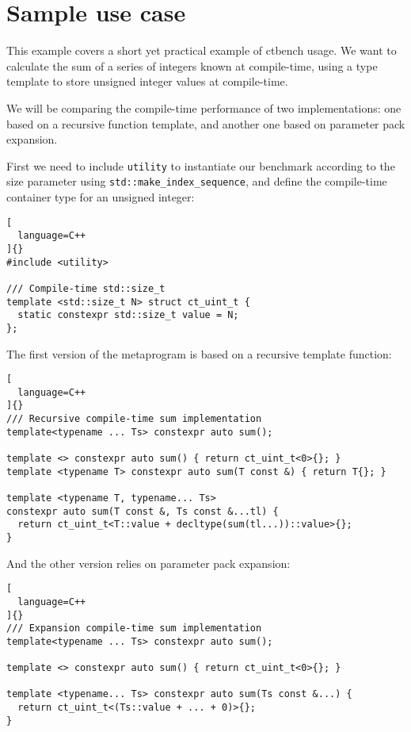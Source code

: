\documentclass[../main]{subfiles}
\begin{document}
\section{
  Sample use case
}

This example covers a short yet practical example of ctbench usage. We want to
calculate the sum of a series of integers known at compile-time, using a type
template to store unsigned integer values at compile-time.

We will be comparing the compile-time performance of two implementations:
one based on a recursive function template,
and another one based on  parameter pack expansion.

First we need to include \lstinline{utility} to instantiate our benchmark
according to the size parameter using \lstinline{std::make_index_sequence}, and
define the compile-time container type for an unsigned integer:

\begin{lstlisting}[
  language=C++
]{}
#include <utility>

/// Compile-time std::size_t
template <std::size_t N> struct ct_uint_t {
  static constexpr std::size_t value = N;
};
\end{lstlisting}

The first version of the metaprogram is based on a recursive template function:

\begin{lstlisting}[
  language=C++
]{}
/// Recursive compile-time sum implementation
template<typename ... Ts> constexpr auto sum();

template <> constexpr auto sum() { return ct_uint_t<0>{}; }
template <typename T> constexpr auto sum(T const &) { return T{}; }

template <typename T, typename... Ts>
constexpr auto sum(T const &, Ts const &...tl) {
  return ct_uint_t<T::value + decltype(sum(tl...))::value>{};
}
\end{lstlisting}

And the other version relies on  parameter pack expansion:

\begin{lstlisting}[
  language=C++
]{}
/// Expansion compile-time sum implementation
template<typename ... Ts> constexpr auto sum();

template <> constexpr auto sum() { return ct_uint_t<0>{}; }

template <typename... Ts> constexpr auto sum(Ts const &...) {
  return ct_uint_t<(Ts::value + ... + 0)>{};
}
\end{lstlisting}
\end{document}
